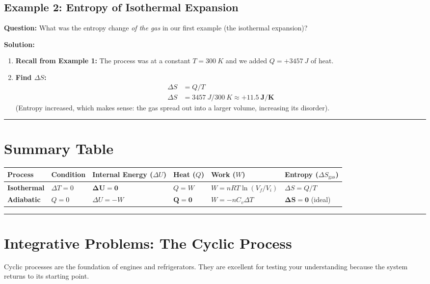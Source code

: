 \documentclass[article]{article}
\begin{document}
\subsection{Example 2: Entropy of Isothermal Expansion}
\textbf{Question:} What was the entropy change \textit{of the gas} in our first example (the isothermal expansion)?

\textbf{Solution:}
\begin{enumerate}
    \item \textbf{Recall from Example 1:} The process was at a constant $T = \SI{300}{K}$ and we added $Q = +\SI{3457}{J}$ of heat.
    \item \textbf{Find $\Delta S$:}
    \begin{align*}
        \Delta S &= Q / T \\
        \Delta S &= \SI{3457}{J} / \SI{300}{K} \approx \mathbf{+\SI{11.5}{J/K}}
    \end{align*}
    (Entropy increased, which makes sense: the gas spread out into a larger volume, increasing its disorder).
\end{enumerate}

\hrule

\section{Summary Table}

\begin{center}
\begin{tabular}{l | l | l | l | l | l}
\toprule
\textbf{Process} & \textbf{Condition} & \textbf{Internal Energy ($\Delta U$)} & \textbf{Heat ($Q$)} & \textbf{Work ($W$)} & \textbf{Entropy ($\Delta S_{\text{gas}}$)} \\
\midrule
\textbf{Isothermal} & $\Delta T = 0$ & $\mathbf{\Delta U = 0}$ & $Q = W$ & $W = nRT \ln(V_f/V_i)$ & $\Delta S = Q/T$ \\
\textbf{Adiabatic} & $Q = 0$ & $\Delta U = -W$ & $\mathbf{Q = 0}$ & $W = -nC_v\Delta T$ & $\mathbf{\Delta S = 0}$ (ideal) \\
\bottomrule
\end{tabular}
\end{center}

\hrule

\section{Integrative Problems: The Cyclic Process}
Cyclic processes are the foundation of engines and refrigerators. They are excellent for testing your understanding because the system returns to its starting point.
\end{document}
